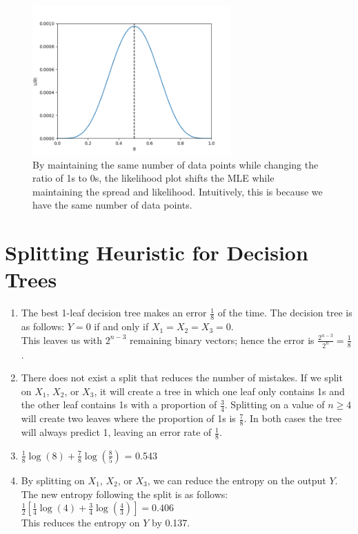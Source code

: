 \documentclass[11pt]{article}
\newcommand{\solution}[1]{{{\color{blue}{\bf Solution:} {#1}}}}
\begin{document}
\begin{enumerate}
{\begin{figure}[!htbp]
    \centering
    \includegraphics[width=3in]{1diii.png}
    \caption{By maintaining the same number of data points while changing the ratio of 1s to 0s, the likelihood plot shifts the MLE while maintaining the spread and likelihood. Intuitively, this is because we have the same number of data points.}
\end{figure}
}
\end{enumerate}
\newpage

\section{Splitting Heuristic for Decision Trees}
\begin{enumerate}
\item
\solution{The best 1-leaf decision tree makes an error $\frac{1}{8}$ of the time.  The decision tree is as follows: $Y = 0$ if and only if $X_1 = X_2 = X_3 = 0$. \\
This leaves us with $2^{n-3}$ remaining binary vectors; hence the error is $\frac{2^{n-3}}{2^n} = \frac{1}{8}$.
}
\vspace{1cm}

\item
\solution{There does not exist a split that reduces the number of mistakes. If we split on $X_1$, $X_2$, or $X_3$, it will create a tree in which one leaf only contains 1s and the other leaf contains 1s with a proportion of $\frac{3}{4}$. Splitting on a value of $n \geq 4$ will create two leaves where the proportion of 1s is $\frac{7}{8}$. In both cases the tree will always predict 1, leaving an error rate of $\frac{1}{8}$.
}
\vspace{1cm}

\item
\solution{$\frac{1}{8}\log(8) + \frac{7}{8}\log(\frac{8}{5})$ = 0.543
}
\vspace{1cm}

\item
\solution{By splitting on $X_1$, $X_2$, or $X_3$, we can reduce the entropy on the output $Y$. The new entropy following the split is as follows: \\
$\frac{1}{2}[\frac{1}{4}\log(4)+\frac{3}{4}\log(\frac{4}{3})]= 0.406$ \\
This reduces the entropy on $Y$ by 0.137.
}
\newpage
\end{enumerate}
\end{document}
